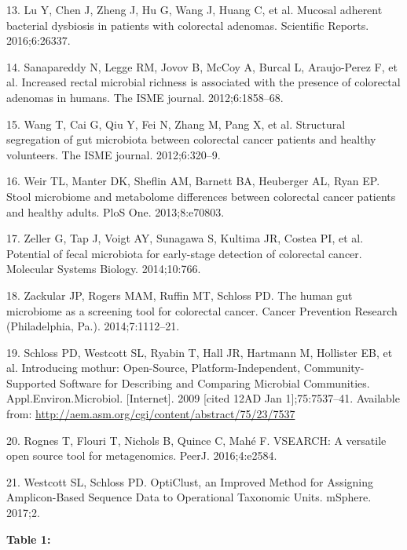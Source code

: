 \documentclass[12pt,]{article}
\begin{document}
\hypertarget{ref-lu_mucosal_2016}{}
13. Lu Y, Chen J, Zheng J, Hu G, Wang J, Huang C, et al. Mucosal
adherent bacterial dysbiosis in patients with colorectal adenomas.
Scientific Reports. 2016;6:26337.

\hypertarget{ref-sanapareddy_increased_2012}{}
14. Sanapareddy N, Legge RM, Jovov B, McCoy A, Burcal L, Araujo-Perez F,
et al. Increased rectal microbial richness is associated with the
presence of colorectal adenomas in humans. The ISME journal.
2012;6:1858--68.

\hypertarget{ref-wang_structural_2012}{}
15. Wang T, Cai G, Qiu Y, Fei N, Zhang M, Pang X, et al. Structural
segregation of gut microbiota between colorectal cancer patients and
healthy volunteers. The ISME journal. 2012;6:320--9.

\hypertarget{ref-weir_stool_2013}{}
16. Weir TL, Manter DK, Sheflin AM, Barnett BA, Heuberger AL, Ryan EP.
Stool microbiome and metabolome differences between colorectal cancer
patients and healthy adults. PloS One. 2013;8:e70803.

\hypertarget{ref-zeller_potential_2014}{}
17. Zeller G, Tap J, Voigt AY, Sunagawa S, Kultima JR, Costea PI, et al.
Potential of fecal microbiota for early-stage detection of colorectal
cancer. Molecular Systems Biology. 2014;10:766.

\hypertarget{ref-zackular_human_2014}{}
18. Zackular JP, Rogers MAM, Ruffin MT, Schloss PD. The human gut
microbiome as a screening tool for colorectal cancer. Cancer Prevention
Research (Philadelphia, Pa.). 2014;7:1112--21.

\hypertarget{ref-schloss_introducing_2009}{}
19. Schloss PD, Westcott SL, Ryabin T, Hall JR, Hartmann M, Hollister
EB, et al. Introducing mothur: Open-Source, Platform-Independent,
Community-Supported Software for Describing and Comparing Microbial
Communities. Appl.Environ.Microbiol. {[}Internet{]}. 2009 {[}cited 12AD
Jan 1{]};75:7537--41. Available from:
\url{http://aem.asm.org/cgi/content/abstract/75/23/7537}

\hypertarget{ref-rognes_vsearch_2016}{}
20. Rognes T, Flouri T, Nichols B, Quince C, Mahé F. VSEARCH: A
versatile open source tool for metagenomics. PeerJ. 2016;4:e2584.

\hypertarget{ref-westcott_opticlust_2017}{}
21. Westcott SL, Schloss PD. OptiClust, an Improved Method for Assigning
Amplicon-Based Sequence Data to Operational Taxonomic Units. mSphere.
2017;2.

\newpage

\textbf{Table 1:}
\end{document}
